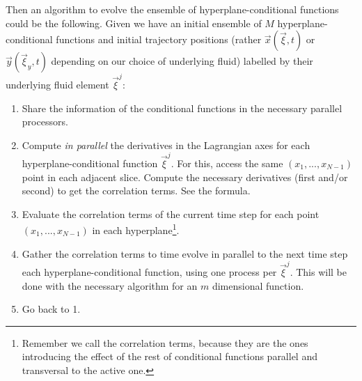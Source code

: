 \documentclass[11pt, a4paper]{article} %
\begin{document}
Then an algorithm to evolve the ensemble of hyperplane-conditional functions could be the following. Given we have an initial ensemble of $M$ hyperplane-conditional functions and initial trajectory positions (rather $\vec{x}(\vec{\xi},t)$ or $\vec{y}(\vec{\xi}_y,t)$ depending on our choice of underlying fluid) labelled by their underlying fluid element $\vec{\xi}^j$:
\begin{enumerate}
\item Share the information of the conditional functions in the necessary parallel processors.
\item Compute {\em in parallel} the derivatives in the Lagrangian axes for each hyperplane-conditional function $\vec{\xi}^j$. For this, access the same $(x_1,...,x_{N-1})$ point in each adjacent slice. Compute the necessary derivatives (first and/or second) to get the correlation terms. See the formula.
\item Evaluate the correlation terms of the current time step for each point $(x_1,...,x_{N-1})$ in each hyperplane\footnote{Remember we call the correlation terms, because they are the ones introducing the effect of the rest of conditional functions parallel and transversal to the active one.}.
\item Gather the correlation terms to time evolve in parallel to the next time step each hyperplane-conditional function, using one process per $\vec{\xi}^j$. This will be done with the necessary algorithm for an $m$ dimensional function.
\item Go back to 1.
\end{enumerate}
\end{document}
